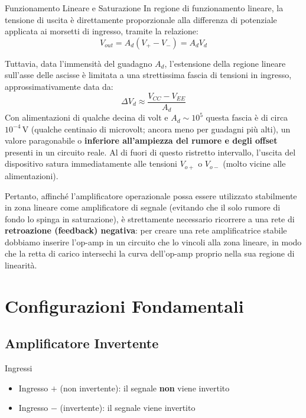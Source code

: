 \begin{definizione}{Funzionamento Lineare e Saturazione}
    In regione di funzionamento lineare, la tensione di uscita è direttamente proporzionale alla differenza di potenziale applicata ai morsetti di ingresso, tramite la relazione:
    \[ V_{out} = A_d (V_+ - V_-) = A_d V_d \]
    
    Tuttavia, data l'immensità del guadagno $A_d$, l'estensione della regione lineare sull'asse delle ascisse è limitata a una strettissima fascia di tensioni in ingresso, approssimativamente data da:
    \[ \Delta V_d \approx \frac{V_{CC} - V_{EE}}{A_d} \]
    Con alimentazioni di qualche decina di volt e $A_d \sim 10^5$ questa fascia è di circa $10^{-4}$\,V (qualche centinaio di microvolt; ancora meno per guadagni più alti), un valore paragonabile o \textbf{inferiore all'ampiezza del rumore e degli offset} presenti in un circuito reale. Al di fuori di questo ristretto intervallo, l'uscita del dispositivo satura immediatamente alle tensioni $V_{o+}$ o $V_{o-}$ (molto vicine alle alimentazioni).
\end{definizione}

Pertanto, affinché l'amplificatore operazionale possa essere utilizzato stabilmente in zona lineare come amplificatore di segnale (evitando che il solo rumore di fondo lo spinga in saturazione), è strettamente necessario ricorrere a una rete di \textbf{retroazione (feedback) negativa}: per creare una rete amplificatrice stabile dobbiamo inserire l'op-amp in un circuito che lo vincoli alla zona lineare, in modo che la retta di carico intersechi la curva dell'op-amp proprio nella sua regione di linearità.

\section{Configurazioni Fondamentali}

\subsection{Amplificatore Invertente}

\begin{osservazione}{Ingressi}
    \begin{itemize}
        \item Ingresso $+$ (non invertente): il segnale \textbf{non} viene invertito
        \item Ingresso $-$ (invertente): il segnale viene invertito
    \end{itemize}
\end{osservazione}

